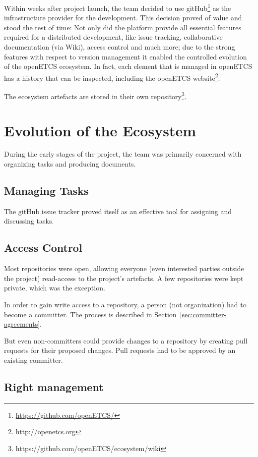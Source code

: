\documentclass{template/openetcs_report}
\begin{document}
Within weeks after project launch, the team decided to use gitHub\footnote{\url{https://github.com/openETCS/}} as the infrastructure provider for the development.  This decision proved of value and stood the test of time: Not only did the platform provide all essential features required for a distributed development, like issue tracking, collaborative documentation (via Wiki), access control and much more; due to the strong features with respect to version management it enabled the controlled evolution of the openETCS ecosystem.  In fact, each element that is managed in openETCS has a history that can be inspected, including the openETCS website\footnote{http://openetcs.org}.

The ecosystem artefacts are stored in their own repository\footnote{https://github.com/openETCS/ecosystem/wiki}.

\chapter{Evolution of the Ecosystem}

During the early stages of the project, the team was primarily concerned with organizing tasks and producing documents. 

\section{Managing Tasks}

The gitHub issue tracker proved itself as an effective tool for assigning and discussing tasks.

\section{Access Control}

Most repositories were open, allowing everyone (even interested parties outside the project) read-access to the project's artefacts. A few repositories were kept private, which was the exception.

In order to gain write access to a repository, a person (not organization) had to become a committer.  The process is described in Section~\ref{sec:committer-agreements}.

But even non-committers could provide changes to a repository by creating pull requests for their proposed changes.  Pull requests had to be approved by an existing committer.

\section{Right management}
\end{document}
